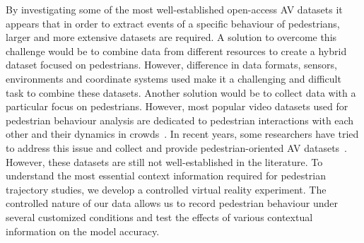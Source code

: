By investigating some of the most well-established open-access AV datasets it appears that in order to extract events of a specific behaviour of pedestrians, larger and more extensive datasets are required. A solution to overcome this challenge would be to combine data from different resources to create a hybrid dataset focused on pedestrians. However, difference in data formats, sensors, environments and coordinate systems used make it a challenging and difficult task to combine these datasets. Another solution would be to collect data with a particular focus on pedestrians. However, most popular video datasets used for pedestrian behaviour analysis are dedicated to pedestrian interactions with each other and their dynamics in crowds~\citep{robicquet2016learning,zhang2019widerperson}. In recent years, some researchers have tried to address this issue and collect and provide pedestrian-oriented AV datasets~\cite{dipietro1970pedestrian,kotseruba2016joint}. However, these datasets are still not well-established in the literature. To understand the most essential context information required for pedestrian trajectory studies, we develop a controlled virtual reality experiment. The controlled nature of our data allows us to record pedestrian behaviour under several customized conditions and test the effects of various contextual information on the model accuracy.     